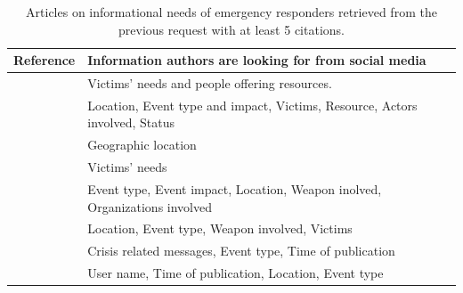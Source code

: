 \begin{table}[bht]
    \centering
    \tabulinesep=1.2mm
    \caption{Articles on informational needs of emergency responders retrieved from the previous request with at least 5 citations.}
    \begin{tabu} to \textwidth {X[1,m]X[3,m]}
        Reference                                            & Information authors are looking for from social media                       \\ [0.5ex]
        \toprule
        \textcite{purohitIdentifyingSeekersSuppliers2014}    & Victims' needs and people offering resources.                               \\
        \textcite{gaurEmpathiOntologyEmergency2019}          & Location, Event type and impact, Victims, Resource, Actors involved, Status \\
        \textcite{ghahremanlouGeotaggingTwitterMessages2014} & Geographic location                                                         \\
        \textcite{bhattAssistingCoordinationCrisis2014}      & Victims' needs                                                              \\
        \textcite{zavarellaOntologybasedApproachSocial2014}  & Event type, Event impact, Location, Weapon inolved, Organizations involved  \\
        \textcite{cocheActionableCollaborativeCommon2019}    & Location, Event type, Weapon involved, Victims                              \\
        \textcite{montarnalAutomatedEmergenceCrisis2017}     & Crisis related messages, Event type, Time of publication                    \\
        \textcite{leeConstructionEventOntology2013}          & User name, Time of publication, Location, Event type                        \\
        \bottomrule
    \end{tabu}
    \label{table:information-model-social-media}
\end{table}

